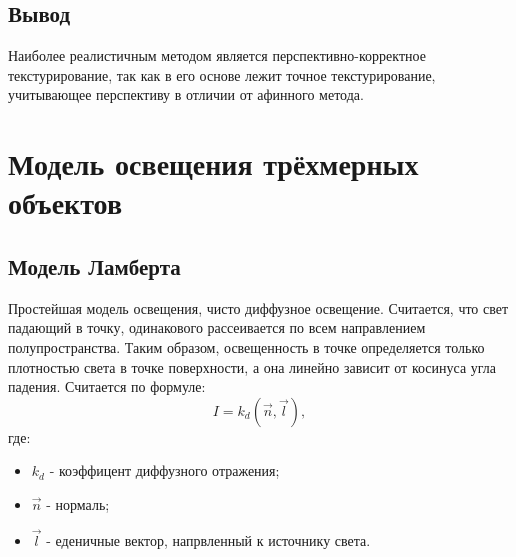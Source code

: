 \documentclass[12pt,a4paper,oneside]{report}
\begin{document}
			\subsection{Вывод}
				\quad Наиболее реалистичным методом является перспективно-корректное текстурирование, так как в его основе лежит точное текстурирование, учитывающее перспективу в отличии от афинного метода.
		\section{Модель освещения трёхмерных объектов}
			\subsection{Модель Ламберта}
				\quad Простейшая модель освещения, чисто диффузное освещение. Считается, что свет падающий в точку, одинакового рассеивается по всем направлением полупространства. Таким образом, освещенность в точке определяется только плотностью света в точке поверхности, а она линейно зависит от косинуса угла падения. Считается по формуле:
				\[
					I = k_{d}(\vec{n}, \vec{l}),
				\]
				где:
				\begin{itemize}
					\item $k_{d}$ - коэффицент диффузного отражения;
					\item $\vec{n}$ -  нормаль;
					\item $\vec{l}$ - еденичные вектор, напрвленный к источнику света.
				\end{itemize}
\end{document}
